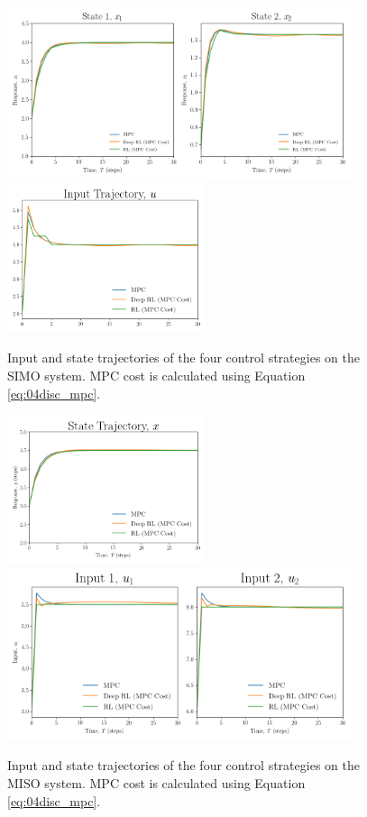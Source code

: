 \begin{figure}[H]
    \centering
    \includegraphics[width=0.9\textwidth]{images/ch4/State_SIMO.png}
    \includegraphics[width=0.52\textwidth]{images/ch4/Input_SIMO.png}
    \caption{Input and state trajectories of the four control strategies on the SIMO system.  MPC cost is calculated using Equation \ref{eq:04disc_mpc}.}
    \label{fig:04SIMO_disc}
\end{figure}

\begin{figure}[H]
    \centering
    \includegraphics[width=0.52\textwidth]{images/ch4/State_MISO.png}
    \includegraphics[width=0.9\textwidth]{images/ch4/Input_MISO.png}
    \caption{Input and state trajectories of the four control strategies on the MISO system.  MPC cost is calculated using Equation \ref{eq:04disc_mpc}.}
    \label{fig:04MISO_disc}
\end{figure}

